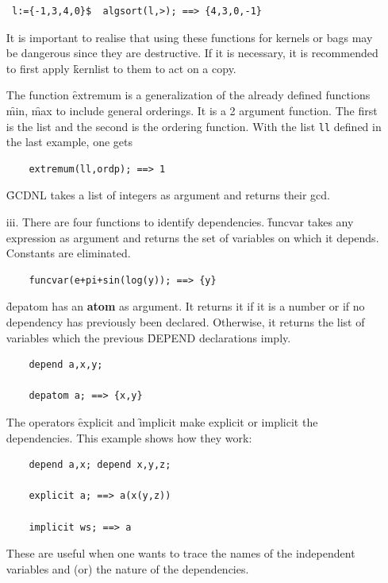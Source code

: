 \begin{itemize}
\begin{verbatim}
 l:={-1,3,4,0}$  algsort(l,>); ==> {4,3,0,-1}
\end{verbatim}
It is important to realise that using these functions for kernels or bags
may be dangerous since they are destructive. If it is necessary, it is
recommended to first apply \f{kernlist} to them to act on a copy.

\hypertarget{operator:EXTREMUM}{}
The function \f{extremum} is a generalization of the already defined functions
\f{min}, \f{max} to include general orderings. It is a 2 argument function.
The first is the list and the second is the ordering function.
With the list \texttt{ll} defined in the last example, one gets
\begin{verbatim}
    extremum(ll,ordp); ==> 1
\end{verbatim}

\hypertarget{operator:GCDNL}{}
\f{GCDNL} takes a list of integers as argument and returns their gcd.
\item[iii.] There are four functions to identify dependencies.
%
\hypertarget{operator:FUNCVAR}{}%
\f{funcvar} takes any expression as argument and returns the set of
variables on which it depends. Constants are  eliminated.
\begin{verbatim}
    funcvar(e+pi+sin(log(y)); ==> {y}
\end{verbatim}
\hypertarget{operator:DEPATOM}{}
\f{depatom} has an \textbf{atom} as argument. It returns it if it is
a number or if no dependency has previously been declared. Otherwise,
it returns the list of variables which the previous \f{DEPEND} declarations
imply.
\begin{verbatim}
    depend a,x,y;

    depatom a; ==> {x,y}
\end{verbatim}
\hypertarget{operator:EXPLICIT}{}
\hypertarget{operator:IMPLICIT}{}
The operators \f{explicit} and \f{implicit} make explicit or
implicit the dependencies. This example shows how they work:
\begin{verbatim}
    depend a,x; depend x,y,z;

    explicit a; ==> a(x(y,z))

    implicit ws; ==> a
\end{verbatim}
These are useful when one wants to trace the names of the independent
variables
and (or) the nature of the dependencies.


\end{itemize}
